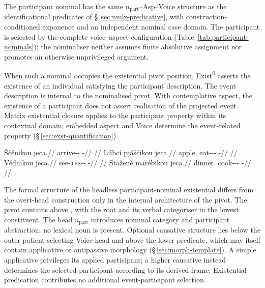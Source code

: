 The participant nominal has the same $n_{\mathrm{part}}$--Asp--Voice
structure as the identificational predicates of §\,\ref{sec:nmlz-predicative}, with construction-conditioned exponence and an
independent nominal case domain. The participant is selected by the complete
voice--aspect configuration (Table~\ref{tab:participant-nominals}); the
nominaliser neither assumes finite absolutive assignment nor promotes an
otherwise unprivileged argument.

\noindent When such a nominal occupies the existential pivot position,
Exist\textsuperscript{0} asserts the existence of an individual satisfying the
participant description. The event description is internal to the nominalised
pivot. With contemplative aspect, the existence of a participant does not
assert realisation of the projected event. Matrix existential closure applies
to the participant property within its contextual domain; embedded aspect and
Voice determine the event-related property (§\,\ref{sec:exst-quantification}).

\pex
\a
\begingl
\gla Ščénikou jeca.//
\glb arrive-\Pf{}-\Nmlz{} \Exst{}-\Cont{}//
\glft {} //
\endgl
\a
\begingl
\gla Lúbcí pjáščikou jeca.//
\glb apple.\Ind{} eat-\Antip{}-\Pf{}-\Nmlz{} \Exst{}-\Cont{}//
\glft {} //
\endgl
\a
\begingl
\gla Védnikou jeca.//
\glb see-\textsc{trs}-\Pf{}-\Nmlz{} \Exst{}-\Cont{}//
\glft {} //
\endgl
\a
\begingl
\gla Staženě marébikou jeca.//
\glb dinner.\Ind{} cook-\Appl{}-\Pf{}-\Nmlz{} \Exst{}-\Cont{}//
\glft {} //
\endgl
\xe

The formal structure of the headless participant-nominal existential differs
from the overt-head construction only in the internal architecture of the pivot.
The pivot contains  above , with the root
and its verbal categoriser in the lowest constituent.
The head $n_{\mathrm{part}}$ introduces nominal category and participant
abstraction; no lexical noun is present. Optional causative structure lies
below the outer patient-selecting Voice head and above the lower predicate,
which may itself contain applicative or antipassive morphology
(§\,\ref{sec:morph-template}). A simple applicative privileges its applied
participant; a higher causative instead determines the selected participant
according to its derived frame. Existential predication contributes no
additional event-participant selection.


